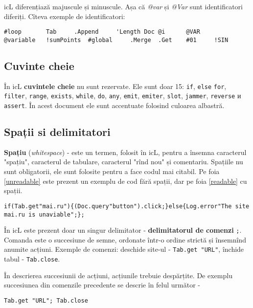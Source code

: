 icL diferențiază majuscule și minuscule. Așa că \textit{@var} și \textit{@Var} sunt identificatori diferiți. Cîteva exemple de identificatori:

\begin{lstlisting}[numbers=none]
#loop		Tab		.Append		'Length	Doc	@i	 	@VAR
@variable	!sumPoints	#global		.Merge	.Get	#01		!SIN
\end{lstlisting}

\subsection{Cuvinte cheie}

În icL \textbf{cuvintele cheie} nu sunt rezervate. Ele sunt doar 15: \lstinline`if`, \lstinline|else| \lstinline`for`, \lstinline`filter`, \lstinline`range`, \lstinline`exists`, \lstinline`while`, \lstinline`do`, \lstinline`any`, \lstinline`emit`, \lstinline`emiter`, \lstinline`slot`, \lstinline|jammer|, \lstinline|reverse| и \lstinline|assert|. În acest document ele sunt accentuate folosind culoarea albastră.

\subsection{Spații si delimitatori}

\textbf{Spațiu} (\textit{whitespace}) - este un termen, folosit în icL, pentru a însemna caracterul "spațiu", caracterul de tabulare, caracterul "rînd nou" și comentariu. Spațiile nu sunt obligatorii, ele sunt folosite pentru a face codul mai citabil. Pe foia \ref{unreadable} este prezent un exemplu de cod fără spații, dar pe foia \ref{readable} cu spații.

\begin{lstlisting}[caption=Cod fără spații,label=unreadable]
if(Tab.get"mai.ru"){(Doc.query"button").click;}else{Log.error"The site mai.ru is unaviable";};
\end{lstlisting}

În icL este prezent doar un singur delimitator - \textbf{delimitatorul de comenzi} \lstinline`;`. Comanda este o succesiune de semne, ordonate într-o ordine strictă și însemnînd anumite acțiuni. Exemple de comenzi: deschide site-ul - \lstinline`Tab.get "URL"`, închide tabul - \lstinline`Tab.close`.

În descrierea succesiunii de acțiuni, acțiunile trebuie despărțite. De exemplu succesiunea din comenzile precedente se descrie în felul următor -
\begin{lstlisting}[numbers=none]
Tab.get "URL"; Tab.close
\end{lstlisting}

